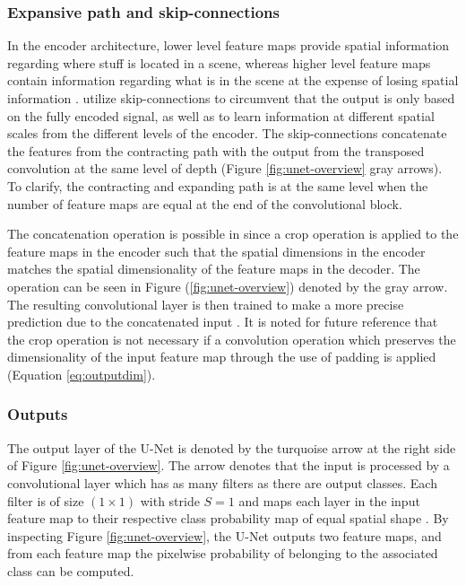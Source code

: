 \documentclass[../main/thesis.tex]{subfiles}
\begin{document}
\subsubsection{Expansive path and skip-connections}
In the encoder architecture, lower level feature maps provide spatial information regarding where stuff is located in a scene, whereas higher level feature maps contain information regarding what is in the scene at the expense of losing spatial information \citep{Long2015}. \citet{Ronneberger2015} utilize skip-connections to circumvent that the output is only based on the fully encoded signal, as well as to learn information at different spatial scales from the different levels of the encoder. The skip-connections concatenate the features from the contracting path with the output from the transposed convolution at the same level of depth (Figure \ref{fig:unet-overview} gray arrows). To clarify, the contracting and expanding path is at the same level when the number of feature maps are equal at the end of the convolutional block. 

The concatenation operation is possible in \citet{Ronneberger2015} since a crop operation is applied to the feature maps in the encoder such that the spatial dimensions in the encoder matches the spatial dimensionality of the feature maps in the decoder. The operation can be seen in Figure (\ref{fig:unet-overview}) denoted by the gray arrow. The resulting convolutional layer is then trained to make a more precise prediction due to the concatenated input \citep{Ronneberger2015}. It is noted for future reference that the crop operation is not necessary if a convolution operation which preserves the dimensionality of the input feature map through the use of padding is applied (Equation \ref{eq:outputdim}).

\subsubsection{Outputs}
The output layer of the U-Net is denoted by the turquoise arrow at the right side of Figure \ref{fig:unet-overview}. The arrow denotes that the input is processed by a convolutional layer which has as many filters as there are output classes. Each filter is of size $(1 \times 1)$ with stride $S=1$ and maps each layer in the input feature map to their respective class probability map of equal spatial shape \citep{Ronneberger2015}. By inspecting Figure \ref{fig:unet-overview}, the U-Net outputs two feature maps, and from each feature map the pixelwise probability of belonging to the associated class can be computed.
\end{document}
